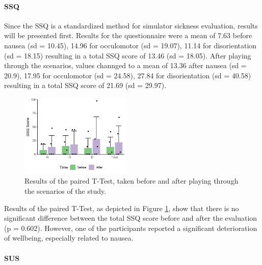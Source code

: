 \paragraph{SSQ}

Since the SSQ is a standardized method for simulator sickness evaluation, 
results will be presented first.
Results for the questionnaire were a mean of 7.63 before
nausea (sd = 10.45), 14.96 for occulomotor (sd = 19.07),
11.14 for disorientation (sd = 18.15)  resulting in 
a total SSQ score of 13.46 (sd = 18.05).
After playing through the scenarios, values channged to
a mean of 13.36 after
nausea (sd = 20.9), 17.95 for occulomotor (sd = 24.58),
27.84 for disorientation (sd = 40.58) resulting in 
a total SSQ score of 21.69 (sd = 29.97).

\begin{figure}[ht]
    \centering
    \includegraphics[width=200px]{images/evaluation/VR-SSQ.png}
    \caption{\label{fig::ssq}Results of the paired T-Test,
    taken before and after playing through the scenarios of the study.}
\end{figure}

Results of the paired T-Test, as depicted in Figure \ref{fig::ssq},
show that 
there is no significant difference between the total SSQ 
score before and after the evaluation (p = 0.602).
However, one of the participants reported a significant deterioration
of wellbeing, especially related to nausea.

\paragraph{SUS}

